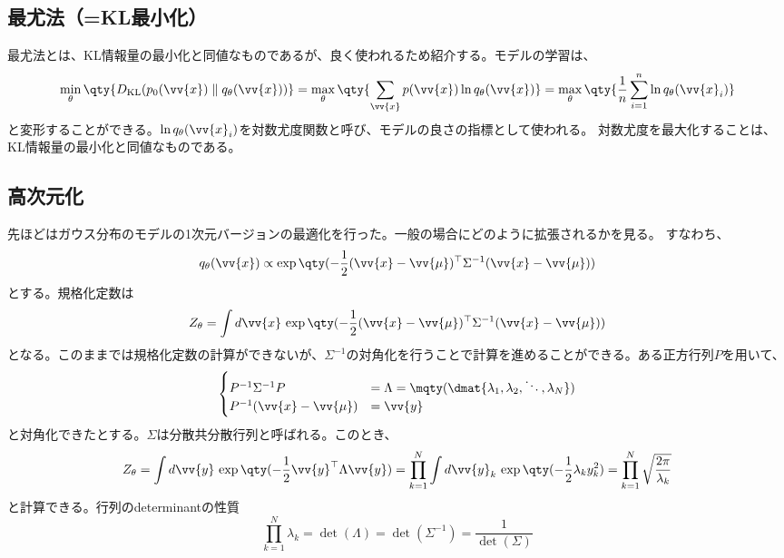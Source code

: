 \documentclass[a4paper,11pt,uplatex]{jsarticle}%
\begin{document}
\subsection{最尤法（=KL最小化）}
最尤法とは、KL情報量の最小化と同値なものであるが、良く使われるため紹介する。モデルの学習は、
\begin{equation}
  \min_{\theta}\qty{D_{\text{KL}}(p_0(\vv{x})\parallel q_{\theta}(\vv{x}))}
  = \max_{\theta}\qty{\sum_{\vv{x}}p(\vv{x})\ln{q_{\theta}(\vv{x})}}
  = \max_{\theta}\qty{\frac{1}{n}\sum_{i=1}^n\ln{q_{\theta}(\vv{x}_i)}}
\end{equation}
と変形することができる。$\ln{q_{\theta}(\vv{x}_i)}$を対数尤度関数と呼び、モデルの良さの指標として使われる。
対数尤度を最大化することは、KL情報量の最小化と同値なものである。
\subsection{高次元化}
先ほどはガウス分布のモデルの1次元バージョンの最適化を行った。一般の場合にどのように拡張されるかを見る。
すなわち、
\begin{equation}
  q_{\theta}(\vv{x}) \propto \exp\qty(-\frac{1}{2}(\vv{x}-\vv{\mu})^{\top}\Sigma^{-1}(\vv{x}-\vv{\mu}))
\end{equation}
とする。規格化定数は
\begin{equation}
  Z_{\theta} = \int d\vv{x}\,\exp\qty(-\frac{1}{2}(\vv{x}-\vv{\mu})^{\top}\Sigma^{-1}(\vv{x}-\vv{\mu}))
\end{equation}
となる。このままでは規格化定数の計算ができないが、$\Sigma^{-1}$の対角化を行うことで計算を進めることができる。ある正方行列$P$を用いて、
\begin{equation}
  \begin{cases}
    P^{-1}\Sigma^{-1}P      & = \Lambda = \mqty(\dmat{\lambda_1,\lambda_2,\ddots,\lambda_N}) \\
    P^{-1}(\vv{x}-\vv{\mu}) & = \vv{y}
  \end{cases}
\end{equation}
と対角化できたとする。$\Sigma$は分散共分散行列と呼ばれる。このとき、
\begin{equation}
  Z_{\theta} = \int d\vv{y}\,\exp\qty(-\frac{1}{2}\vv{y}^{\top}\Lambda\vv{y})
  = \prod_{k=1}^{N}\int d\vv{y}_k\,\exp\qty(-\frac{1}{2}\lambda_{k}y_{k}^2)
  = \prod_{k=1}^{N}\sqrt{\frac{2\pi}{\lambda_k}}
\end{equation}
と計算できる。行列のdeterminantの性質
\begin{equation}
  \prod_{k=1}^{N}\lambda_k = \det(\Lambda) = \det(\Sigma^{-1}) = \frac{1}{\det(\Sigma)}
\end{equation}
\end{document}

